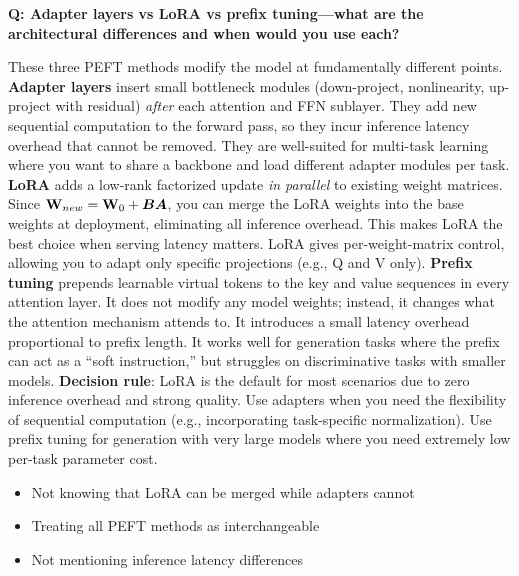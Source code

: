 \begin{interviewq}
\textbf{Q: Adapter layers vs LoRA vs prefix tuning---what are the architectural differences and when would you use each?}

 \quad {} \quad \badgefreq{\freqmed}

\stronganswer These three PEFT methods modify the model at fundamentally different points. \textbf{Adapter layers} insert small bottleneck modules (down-project, nonlinearity, up-project with residual) \textit{after} each attention and FFN sublayer. They add new sequential computation to the forward pass, so they incur inference latency overhead that cannot be removed. They are well-suited for multi-task learning where you want to share a backbone and load different adapter modules per task. \textbf{LoRA} adds a low-rank factorized update \textit{in parallel} to existing weight matrices. Since $\mathbf{W}_{new} = \mathbf{W}_0 + \bm{B}\bm{A}$, you can merge the LoRA weights into the base weights at deployment, eliminating all inference overhead. This makes LoRA the best choice when serving latency matters. LoRA gives per-weight-matrix control, allowing you to adapt only specific projections (e.g., Q and V only). \textbf{Prefix tuning} prepends learnable virtual tokens to the key and value sequences in every attention layer. It does not modify any model weights; instead, it changes what the attention mechanism attends to. It introduces a small latency overhead proportional to prefix length. It works well for generation tasks where the prefix can act as a ``soft instruction,'' but struggles on discriminative tasks with smaller models. \textbf{Decision rule}: LoRA is the default for most scenarios due to zero inference overhead and strong quality. Use adapters when you need the flexibility of sequential computation (e.g., incorporating task-specific normalization). Use prefix tuning for generation with very large models where you need extremely low per-task parameter cost.

\redflags
\begin{itemize}
    \item Not knowing that LoRA can be merged while adapters cannot
    \item Treating all PEFT methods as interchangeable
    \item Not mentioning inference latency differences
\end{itemize}



\end{interviewq}
